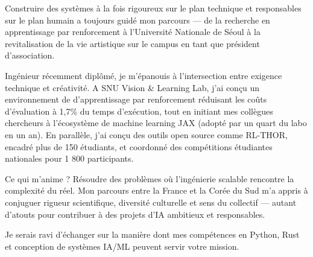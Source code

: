 
\newcommand{\Company}{}
\recipient{\phantom{.}}{}
\date{}
\makelettertitle{}
Construire des systèmes à la fois rigoureux sur le plan technique et responsables sur le plan humain a toujours guidé mon parcours — de la recherche en apprentissage par renforcement à l'Université Nationale de Séoul à la revitalisation de la vie artistique sur le campus en tant que président d'association.

Ingénieur récemment diplômé, je m'épanouis à l'intersection entre exigence technique et créativité. A SNU Vision \& Learning Lab, j'ai conçu un environnement de d'apprentissage par renforcement réduisant les coûts d'évaluation à 1,7\% du temps d'exécution, tout en initiant mes collègues chercheurs à l'écosystème de machine learning JAX (adopté par un quart du labo en un an). En parallèle, j'ai conçu des outils open source comme RL-THOR, encadré plus de 150 étudiants, et coordonné des compétitions étudiantes nationales pour 1 800 participants.

Ce qui m'anime ? Résoudre des problèmes où l'ingénierie scalable rencontre la complexité du réel. Mon parcours entre la France et la Corée du Sud m'a appris à conjuguer rigueur scientifique, diversité culturelle et sens du collectif — autant d'atouts pour contribuer à des projets d'IA ambitieux et responsables.

Je serais ravi d'échanger sur la manière dont mes compétences en Python, Rust et conception de systèmes IA/ML peuvent servir votre mission.

\makeletterclosing
